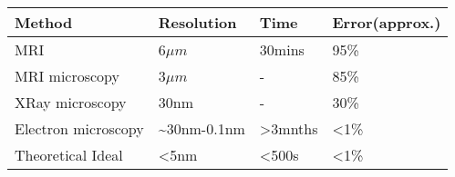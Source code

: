 \setlength{\tabcolsep}{4ex}
\renewcommand{\arraystretch}{1.1}
\begin{table}[ht]
    \centering
    \begin{tabular}{@{}llll@{}}
        Method              & Resolution                 & Time    & Error(approx.) \\
        \hline
        MRI                 & 6$\mu m$                   & 30mins  & 95\%           \\
        MRI microscopy      & 3$\mu m$                   & -       & 85\%           \\
        XRay microscopy     & 30nm                       & -       & 30\%           \\
        Electron microscopy & \textasciitilde 30nm-0.1nm & >3mnths & <1\%           \\
        Theoretical Ideal   & <5nm                       & <500s   & <1\%           \\
        \hline
    \end{tabular}
    \label{imagemethodcomparison1}
\end{table}
\setlength{\tabcolsep}{1ex}